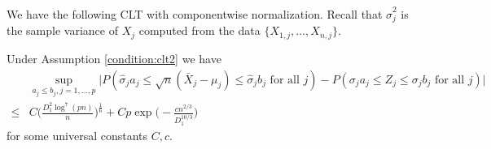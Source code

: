 \documentclass[mnsc,blindrev]{informs4} %
\newcommand{\abs}[1]{\left \vert #1 \right\vert}
\begin{document}

We have the following CLT with componentwise normalization. Recall that $\hat\sigma_j^2$ is the sample variance of $X_j$ computed from the data $\{X_{1,j},\ldots,X_{n,j}\}$.
\begin{theorem}\label{clt3:generalcvx}
Under Assumption \ref{condition:clt2} we have
\begin{align*}
&\sup_{a_j\leq b_j,j=1,\ldots,p}\Big\lvert P(\hat\sigma_ja_j\leq \sqrt n(\bar{X}_j-\mu_j)\leq \hat\sigma_jb_j\text{ for all }j)-P(\sigma_ja_j\leq Z_j\leq \sigma_jb_j\text{ for all }j)\Big\rvert\\
\leq&C\Big(\frac{D_1^2\log^7(pn)}{n}\Big)^{\frac{1}{6}}+Cp\exp\big(-\frac{cn^{2/3}}{D_1^{10/3}}\big)
\end{align*}
for some universal constants $C,c$.
\end{theorem}
\end{document}
